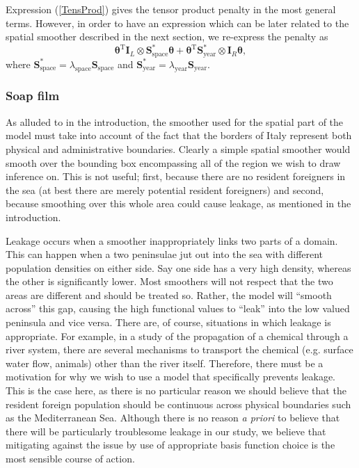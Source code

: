 Expression (\ref{TensProd}) gives the tensor product penalty in the most general terms. However, in order to have an expression which can be later related to the spatial smoother described in the next section, we re-express the penalty as
$$
\bm\theta^\text{T} \textbf{I}_L \otimes \textbf{S}^*_\text{space} \bm\theta + \bm\theta^\text{T} \textbf{S}^*_\text{year} \otimes \textbf{I}_R  \bm\theta,
$$
where $\textbf{S}^*_\text{space}=\lambda_\text{space} \textbf{S}_\text{space}$ and $\textbf{S}^*_\text{year}=\lambda_\text{year} \textbf{S}_\text{year}$.


\subsubsection{Soap film \label{SF}}

As alluded to in the introduction, the smoother used for the spatial part of the model must take into account of the fact that the borders of Italy represent both physical and administrative boundaries. Clearly a simple spatial smoother would smooth over the bounding box encompassing all of the region we wish to draw inference on. This is not useful; first, because there are no resident foreigners in the sea (at best there are merely potential resident foreigners) and second, because smoothing over this whole area could cause leakage, as mentioned in the introduction.

Leakage occurs when a smoother inappropriately links two parts of a domain. This can happen when a two peninsulae jut out into the sea with different population densities on either side. Say one side has a very high density, whereas the other is significantly lower. Most smoothers will not respect that the two areas are different and should be treated so. Rather, the model will ``smooth across'' this gap, causing the high functional values to ``leak'' into the low valued peninsula and vice versa. There are, of course, situations in which leakage is appropriate. For example, in a study of the propagation of a chemical through a river system, there are several mechanisms to transport the chemical (e.g. surface water flow, animals) other than the river itself. Therefore, there must be a motivation for why we wish to use a model that specifically prevents leakage. This is the case here, as there is no particular reason we should believe that the resident foreign population should be continuous across physical boundaries such as the Mediterranean Sea. Although there is no reason \textit{a priori} to believe that there will be particularly troublesome leakage in our study, we believe that mitigating against the issue by use of appropriate basis function choice is the most sensible course of action. 

